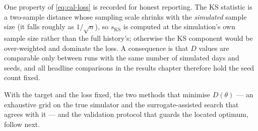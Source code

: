 One property of \eqref{eq:cal-loss} is recorded for honest reporting. The KS
statistic is a two-sample distance whose sampling scale shrinks with the
\emph{simulated} sample size (it falls roughly as $1/\sqrt{n}$), so $s_{\mathrm{KS}}$
is computed at the simulation's own sample size rather than the full history's;
otherwise the KS component would be over-weighted and dominate the loss.
A consequence is that $D$ values are comparable only between runs with the same
number of simulated days and seeds, and all headline comparisons in the results
chapter therefore hold the seed count fixed.

\bigskip
\noindent
With the target and the loss fixed, the two methods that minimise $D(\theta)$ ---
an exhaustive grid on the true simulator and the surrogate-assisted search that
agrees with it --- and the validation protocol that guards the located optimum,
follow next.


%
%
%
